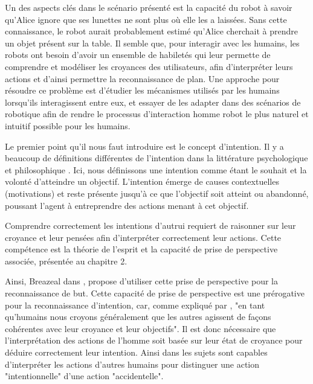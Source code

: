 \documentclass[a4paper,11pt,twoside]{StyleThese}
\begin{document}
Un des aspects clés dans le scénario présenté est la capacité du robot à savoir qu'Alice ignore que ses lunettes ne sont plus où elle les a laissées. Sans cette connaissance, le robot aurait probablement estimé qu'Alice cherchait à prendre un objet présent sur la table. 
Il semble que, pour interagir avec les humains, les robots ont besoin d'avoir un ensemble de habiletés qui leur permette de comprendre et modéliser les croyances des utilisateurs, afin d'interpréter leurs actions et d'ainsi permettre la reconnaissance de plan. Une approche pour résoudre ce problème est d'étudier les mécanismes utilisés par les humains lorsqu'ils interagissent entre eux, et essayer de les adapter dans des scénarios de robotique afin de rendre le processus d'interaction homme robot le plus naturel et intuitif possible pour les humains.

Le premier point qu'il nous faut introduire est le concept d'intention. Il y a beaucoup de définitions différentes de l'intention dans la littérature psychologique  \cite{bruner1981} et philosophique \cite{bratman1984}. Ici, nous définissons une intention comme étant le souhait et la volonté d'atteindre un objectif. L'intention émerge de causes contextuelles (motivations) et reste présente jusqu'à ce que l'objectif soit atteint ou abandonné, poussant l'agent à entreprendre des actions menant à cet objectif.

Comprendre correctement les intentions d'autrui requiert de raisonner sur leur croyance et leur pensées afin d'interpréter correctement leur actions. Cette compétence est la théorie de l'esprit et la capacité de prise de perspective associée, présentée au chapitre 2.

Ainsi, Breazeal dans \cite{BreazealGB09}, propose d'utiliser cette prise de perspective pour la reconnaissance de but. Cette capacité de prise de perspective est une prérogative pour la reconnaissance d'intention, car, comme expliqué par \cite{byom2013theory}, "en tant qu'humains nous croyons généralement que les autres agissent de façons cohérentes avec leur croyance et leur objectifs". Il est donc nécessaire que l'interprétation des actions de l'homme soit basée sur leur état de croyance pour déduire correctement leur intention. Ainsi dans \cite{Call1998} les sujets sont capables d'interpréter les actions d'autres humains pour distinguer une action "intentionnelle" d'une action "accidentelle".
\end{document}
